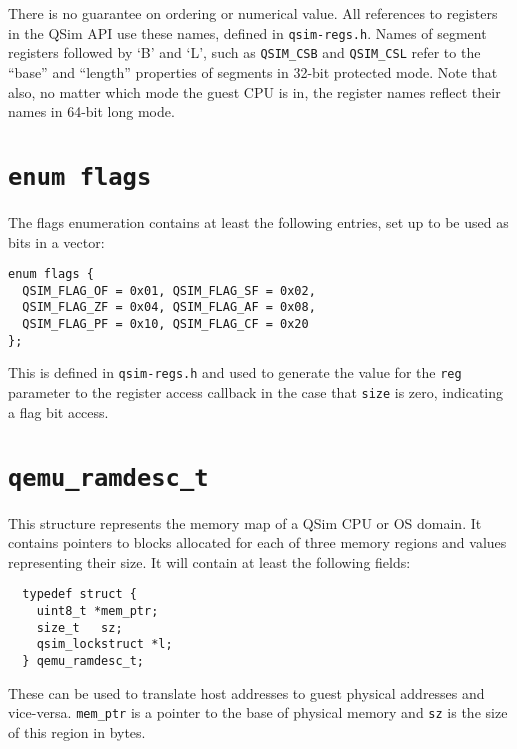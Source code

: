 \documentclass[letterpaper, 10pt]{book}
\begin{document}
There is no guarantee on ordering or numerical value. All references to
registers in the QSim API use these names, defined in \texttt{qsim-regs.h}.
Names of segment registers followed by `B' and `L', such as \texttt{QSIM\_CSB}
and \texttt{QSIM\_CSL} refer to the ``base'' and ``length'' properties of
segments in 32-bit protected mode. Note that also, no matter which mode the 
guest CPU is in, the register names reflect their names in 64-bit long mode.
\newpage

\section{\texttt{enum flags}} \label{enum:flags}
The flags enumeration contains at least the following entries, set up to be
used as bits in a vector:

\begin{verbatim}
enum flags {
  QSIM_FLAG_OF = 0x01, QSIM_FLAG_SF = 0x02,
  QSIM_FLAG_ZF = 0x04, QSIM_FLAG_AF = 0x08,
  QSIM_FLAG_PF = 0x10, QSIM_FLAG_CF = 0x20
};
\end{verbatim}

This is defined in \texttt{qsim-regs.h} and used to generate the value for the
\texttt{reg} parameter to the register access callback in the case that
\texttt{size} is zero, indicating a flag bit access.

\section{\texttt{qemu\_ramdesc\_t}} \label{struct:qemu_ramdesc_t}
This structure represents the memory map of a QSim CPU or OS domain. It
contains pointers to blocks allocated for each of three memory regions and
values representing their size. It will contain at least the following fields:

\begin{verbatim}
  typedef struct {
    uint8_t *mem_ptr;
    size_t   sz;
    qsim_lockstruct *l;
  } qemu_ramdesc_t;
\end{verbatim}

These can be used to translate host addresses to guest physical addresses and 
vice-versa. \texttt{mem\_ptr} is a pointer to the base of physical memory and
\texttt{sz} is the size of this region in bytes.

\newpage
\end{document}
